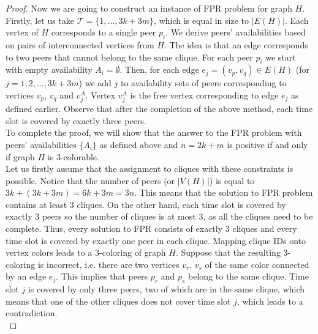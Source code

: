 \documentclass{pracamgren}
\begin{document}
\begin{proof}
Now we are going to construct an instance of FPR problem for graph $H$. Firstly, let us take $\mathcal{T} = \{1,\ldots,3k + 3m\}$, which is equal in size to $|E(H)|$. Each vertex of $H$ corresponds to a single peer $p_i$. We derive peers' availabilities based on pairs of interconnected vertices from $H$. The idea is that an edge corresponds to two peers that cannot belong to the same clique. For each peer $p_i$ we start with empty availability $A_i=\emptyset$. Then, for each edge $e_j = (v_p,v_q) \in E(H)$ (for $j = 1,2,\ldots,3k+3m$) we add $j$ to availability sets of peers corresponding to vertices $v_p$, $v_q$ and $v^A_j$. Vertex $v^A_j$ is the free vertex corresponding to edge $e_j$ as defined earlier. Observe that after the completion of the above method, each time slot is covered by exactly three peers.\\

To complete the proof, we will show that the answer to the FPR problem with peers' availabilities $\{A_i\}$ as defined above and $n=2k+m$ is positive if and only if graph $H$ is 3-colorable.\\

Let us firstly assume that the assignment to cliques with these constraints is possible. Notice that the number of peers (or $|V(H)|$) is equal to $3k+(3k+3m)=6k+3m=3n$. This means that the solution to FPR problem contains at least 3 cliques. On the other hand, each time slot is covered by exactly 3 peers so the number of cliques is at most 3, as all the cliques need to be complete. Thus, every solution to FPR consists of exactly 3 cliques and every time slot is covered by exactly one peer in each clique. Mapping clique IDs onto vertex colors leads to a 3-coloring of graph $H$. Suppose that the resulting 3-coloring is incorrect, i.e. there are two vertices $v_r$, $v_s$ of the same color connected by an edge $e_j$. This implies that peers $p_r$ and $p_s$ belong to the same clique. Time slot $j$ is covered by only three peers, two of which are in the same clique, which means that one of the other cliques does not cover time slot $j$, which leads to a contradiction.\\


\end{proof}
\end{document}

